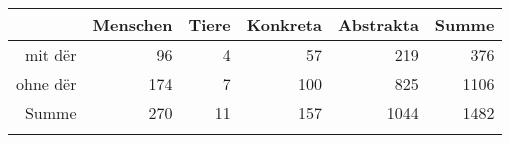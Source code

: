 \begin{tabular}{rrrrrr}
  \lsptoprule
 & Menschen & Tiere & Konkreta & Abstrakta & Summe \\ 
  \midrule
mit dër & 96 & 4 & 57 & 219 & 376 \\ 
  ohne dër & 174 & 7 & 100 & 825 & 1106 \\ 
  Summe & 270 & 11 & 157 & 1044 & 1482 \\ 
   \lspbottomrule
\end{tabular}
